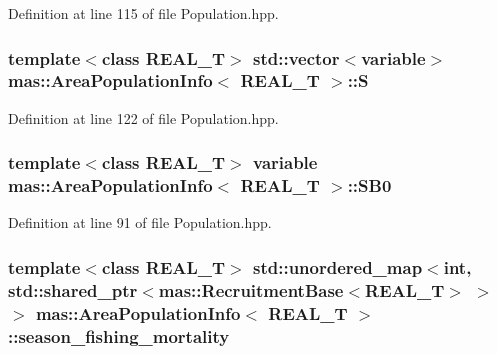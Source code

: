 Definition at line 115 of file Population.\-hpp.

\hypertarget{structmas_1_1_area_population_info_a243e378f215ec809ae0448004a1bd299}{
\subsubsection[{S}]{\setlength{\rightskip}{0pt plus 5cm}template$<$class R\-E\-A\-L\-\_\-\-T$>$ std\-::vector$<${\bf variable}$>$ {\bf mas\-::\-Area\-Population\-Info}$<$ R\-E\-A\-L\-\_\-\-T $>$\-::S}}\label{structmas_1_1_area_population_info_a243e378f215ec809ae0448004a1bd299}


Definition at line 122 of file Population.\-hpp.

\hypertarget{structmas_1_1_area_population_info_a5f549939ff6cb6558b22a6f24da63556}{
\subsubsection[{S\-B0}]{\setlength{\rightskip}{0pt plus 5cm}template$<$class R\-E\-A\-L\-\_\-\-T$>$ {\bf variable} {\bf mas\-::\-Area\-Population\-Info}$<$ R\-E\-A\-L\-\_\-\-T $>$\-::S\-B0}}\label{structmas_1_1_area_population_info_a5f549939ff6cb6558b22a6f24da63556}


Definition at line 91 of file Population.\-hpp.

\hypertarget{structmas_1_1_area_population_info_a1f60363498c8044b38d34519e3a26d6c}{
\subsubsection[{season\-\_\-fishing\-\_\-mortality}]{\setlength{\rightskip}{0pt plus 5cm}template$<$class R\-E\-A\-L\-\_\-\-T$>$ std\-::unordered\-\_\-map$<$int, std\-::shared\-\_\-ptr$<${\bf mas\-::\-Recruitment\-Base}$<$R\-E\-A\-L\-\_\-\-T$>$ $>$ $>$ {\bf mas\-::\-Area\-Population\-Info}$<$ R\-E\-A\-L\-\_\-\-T $>$\-::season\-\_\-fishing\-\_\-mortality}}\label{structmas_1_1_area_population_info_a1f60363498c8044b38d34519e3a26d6c}


